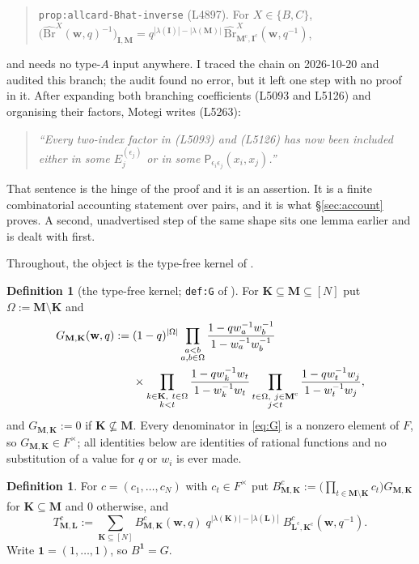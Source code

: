\documentclass[11pt]{article}
\theoremstyle{plain}
\theoremstyle{definition}
\newtheorem{defn}[thm]{Definition}
\theoremstyle{remark}
\newcommand{\bM}{\mathbf M}
\newcommand{\bK}{\mathbf K}
\newcommand{\bL}{\mathbf L}
\newcommand{\bI}{\mathbf I}
\newcommand{\bw}{\mathbf w}
\newcommand{\cm}{{\mathrm c}}
\newcommand{\Bh}{\widehat{\mathrm{Br}}}
\newcommand{\Om}{\Omega}
\begin{document}
\begin{quote}
\texttt{prop:allcard-Bhat-inverse} (L4897). For $X\in\{B,C\}$,
$\bigl(\Bh^X(\bw,q)^{-1}\bigr)_{\bI,\bM}
 = q^{|\lambda(\bI)|-|\lambda(\bM)|}\,\Bh^X_{\bM^\cm,\bI^\cm}(\bw,q^{-1})$,
\end{quote}

\noindent
and needs no type-$A$ input anywhere. I traced the chain on 2026-10-20 and audited
this branch; the audit found no error, but it left one step with no proof in it.
After expanding both branching coefficients (L5093 and L5126) and organising their
factors, Motegi writes (L5263):

\begin{quote}
\emph{``Every two-index factor in \textup{(}L5093\textup{)} and
\textup{(}L5126\textup{)} has now been included either in some $E_j^{(\epsilon_j)}$
or in some $\mathsf P_{\epsilon_i\epsilon_j}(x_i,x_j)$.''}
\end{quote}

That sentence is the hinge of the proof and it is an assertion. It is a finite
combinatorial accounting statement over pairs, and it is what \S\ref{sec:account}
proves. A second, unadvertised step of the same shape sits one lemma earlier and is
dealt with first.

\medskip
\noindent
Throughout, the object is the type-free kernel of \cite{ClioA}.

\begin{defn}[the type-free kernel; \texttt{def:G} of \cite{ClioA}]
\label{def:G}
For $\bK\subseteq\bM\subseteq[N]$ put $\Om:=\bM\setminus\bK$ and
\begin{align}
G_{\bM,\bK}(\bw,q):={}&(1-q)^{|\Om|}
\prod_{\substack{a<b\\ a,b\in\Om}}
\frac{1-qw_a^{-1}w_b^{-1}}{1-w_a^{-1}w_b^{-1}}
\notag\\
&\times
\prod_{\substack{k\in\bK,\ t\in\Om\\ k<t}}
\frac{1-qw_k^{-1}w_t}{1-w_k^{-1}w_t}
\prod_{\substack{t\in\Om,\ j\in\bM^\cm\\ j<t}}
\frac{1-qw_t^{-1}w_j}{1-w_t^{-1}w_j},
\label{eq:G}
\end{align}
and $G_{\bM,\bK}:=0$ if $\bK\not\subseteq\bM$. Every denominator in \eqref{eq:G} is
a nonzero element of $F$, so $G_{\bM,\bK}\in F^\times$; all identities below are
identities of rational functions and no substitution of a value for $q$ or $w_i$ is
ever made.
\end{defn}

\begin{defn}
\label{def:T}
For $c=(c_1,\dots,c_N)$ with $c_t\in F^\times$ put
$B^c_{\bM,\bK}:=\bigl(\prod_{t\in\bM\setminus\bK}c_t\bigr)G_{\bM,\bK}$ for
$\bK\subseteq\bM$ and $0$ otherwise, and
\begin{equation}
T^c_{\bM,\bL}
:=\sum_{\bK\subseteq[N]}
B^c_{\bM,\bK}(\bw,q)\;
q^{|\lambda(\bK)|-|\lambda(\bL)|}\;
B^c_{\bL^\cm,\bK^\cm}(\bw,q^{-1}).
\label{eq:T}
\end{equation}
Write $\mathbf 1=(1,\dots,1)$, so $B^{\mathbf 1}=G$.
\end{defn}
\end{document}
